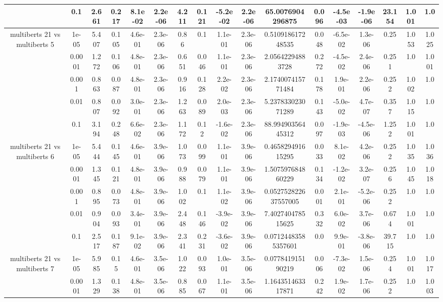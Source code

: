 \begin{tabular}{|c|c|c|c|c|c|c|c|c|c|c|c|c|c|c|c|c|}
 & 0.1 & 2.661 & 0.217 & 8.1e-02 & 2.2e-06 & 4.211 & 0.121 & -5.2e-02 & 2.2e-06 & 65.0076904296875 & 0.096 & -4.5e-03 & -1.9e-06 & 23.154 & 1.001 & 1.0 \\
\hline
\multirow{5}{*}{multiberts 21 vs multiberts 5} & 1e-05 & 5.407 & 0.105 & 4.6e-01 & 2.3e-06 & 0.86 & 0.1 & 1.1e-01 & 2.3e-06 & 0.510918617248535 & 0.048 & -6.5e-02 & 1.3e-06 & 0.25 & 1.053 & 1.025 \\
 & 0.0001 & 1.272 & 0.106 & 4.8e-01 & 2.3e-06 & 0.651 & 0.046 & 1.1e-01 & 2.3e-06 & 2.05642294883728 & 0.272 & -4.5e-02 & 2.4e-06 & 0.251 & 1.0 & 1.001 \\
 & 0.001 & 0.863 & 0.087 & 4.8e-01 & 2.3e-06 & 0.916 & 0.128 & 2.2e-02 & 2.3e-06 & 2.174007415771484 & 0.178 & 1.9e-01 & 2.2e-06 & 0.252 & 1.002 & 1.0 \\
 & 0.01 & 0.807 & 0.092 & 3.0e-01 & 2.3e-06 & 1.263 & 0.089 & 2.0e-03 & 2.3e-06 & 5.237833023071289 & 0.143 & -5.0e-02 & 4.7e-07 & 0.357 & 1.015 & 1.0 \\
 & 0.1 & 3.194 & 0.248 & 6.6e-02 & 2.3e-06 & 1.172 & 0.12 & -1.6e-02 & 2.3e-06 & 88.99490356445312 & 0.097 & -1.9e-03 & -4.5e-06 & 1.252 & 1.001 & 1.0 \\
\hline
\multirow{5}{*}{multiberts 21 vs multiberts 6} & 1e-05 & 5.444 & 0.145 & 4.6e-01 & 3.9e-06 & 1.073 & 0.099 & 1.1e-01 & 3.9e-06 & 0.465829491615295 & 0.033 & 8.1e-02 & 4.2e-06 & 0.252 & 1.035 & 1.036 \\
 & 0.0001 & 1.345 & 0.121 & 4.8e-01 & 3.9e-06 & 0.988 & 0.079 & 1.1e-01 & 3.9e-06 & 1.507597684860229 & 0.134 & -1.2e-02 & 3.2e-07 & 0.256 & 1.045 & 1.018 \\
 & 0.001 & 0.895 & 0.073 & 4.8e-01 & 3.9e-06 & 1.002 & 0.1 & 1.1e-02 & 3.9e-06 & 0.052752822637557005 & 0.001 & 2.1e-01 & -5.2e-06 & 0.252 & 1.0 & 1.0 \\
 & 0.01 & 0.904 & 0.093 & 3.4e-01 & 3.9e-06 & 2.448 & 0.146 & -3.9e-02 & 3.9e-06 & 7.402740478515625 & 0.332 & 6.0e-02 & 3.7e-06 & 0.674 & 1.001 & 1.0 \\
 & 0.1 & 2.517 & 0.187 & 9.1e-02 & 3.9e-06 & 2.341 & 0.231 & -3.6e-02 & 3.9e-06 & 0.07124483585357601 & 0.0 & 9.9e-01 & -3.8e-06 & 39.715 & 1.0 & 1.0 \\
\hline
\multirow{5}{*}{multiberts 21 vs multiberts 7} & 1e-05 & 5.985 & 0.15 & 4.6e-01 & 3.5e-06 & 1.022 & 0.093 & 1.0e-01 & 3.5e-06 & 0.077841915190219 & 0.006 & -7.3e-02 & 1.5e-06 & 0.254 & 1.001 & 1.017 \\
 & 0.0001 & 1.329 & 0.138 & 4.8e-01 & 3.5e-06 & 0.885 & 0.067 & 1.1e-01 & 3.5e-06 & 1.164351463317871 & 0.242 & 1.9e-02 & 1.7e-06 & 0.252 & 1.0 & 1.003 \\

\end{tabular}

